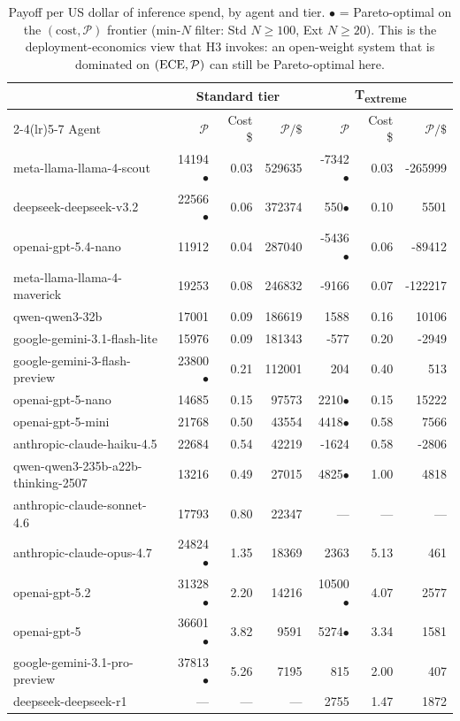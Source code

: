 \begin{table}[t]\centering\small
\caption{Payoff per US dollar of inference spend, by agent and tier. $\bullet$ = Pareto-optimal on the $(\mathrm{cost}, \mathcal{P})$ frontier (min-$N$ filter: Std $N \ge 100$, Ext $N \ge 20$). This is the deployment-economics view that H3 invokes: an open-weight system that is dominated on $(\mathrm{ECE}, \mathcal{P})$ can still be Pareto-optimal here.}
\label{tab:payoff-per-dollar}
\begin{tabular}{lrrr|rrr}
\toprule
 & \multicolumn{3}{c}{Standard tier} & \multicolumn{3}{c}{T\textsubscript{extreme}} \\
\cmidrule(lr){2-4}\cmidrule(lr){5-7}
Agent & $\mathcal{P}$ & Cost \$ & $\mathcal{P}/\$$ & $\mathcal{P}$ & Cost \$ & $\mathcal{P}/\$$ \\
\midrule
meta-llama-llama-4-scout & 14194$\bullet$ & 0.03 & 529635 & -7342$\bullet$ & 0.03 & -265999 \\
deepseek-deepseek-v3.2 & 22566$\bullet$ & 0.06 & 372374 & 550$\bullet$ & 0.10 & 5501 \\
openai-gpt-5.4-nano & 11912 & 0.04 & 287040 & -5436$\bullet$ & 0.06 & -89412 \\
meta-llama-llama-4-maverick & 19253 & 0.08 & 246832 & -9166 & 0.07 & -122217 \\
qwen-qwen3-32b & 17001 & 0.09 & 186619 & 1588 & 0.16 & 10106 \\
google-gemini-3.1-flash-lite & 15976 & 0.09 & 181343 & -577 & 0.20 & -2949 \\
google-gemini-3-flash-preview & 23800$\bullet$ & 0.21 & 112001 & 204 & 0.40 & 513 \\
openai-gpt-5-nano & 14685 & 0.15 & 97573 & 2210$\bullet$ & 0.15 & 15222 \\
openai-gpt-5-mini & 21768 & 0.50 & 43554 & 4418$\bullet$ & 0.58 & 7566 \\
anthropic-claude-haiku-4.5 & 22684 & 0.54 & 42219 & -1624 & 0.58 & -2806 \\
qwen-qwen3-235b-a22b-thinking-2507 & 13216 & 0.49 & 27015 & 4825$\bullet$ & 1.00 & 4818 \\
anthropic-claude-sonnet-4.6 & 17793 & 0.80 & 22347 & --- & --- & --- \\
anthropic-claude-opus-4.7 & 24824$\bullet$ & 1.35 & 18369 & 2363 & 5.13 & 461 \\
openai-gpt-5.2 & 31328$\bullet$ & 2.20 & 14216 & 10500$\bullet$ & 4.07 & 2577 \\
openai-gpt-5 & 36601$\bullet$ & 3.82 & 9591 & 5274$\bullet$ & 3.34 & 1581 \\
google-gemini-3.1-pro-preview & 37813$\bullet$ & 5.26 & 7195 & 815 & 2.00 & 407 \\
deepseek-deepseek-r1 & --- & --- & --- & 2755 & 1.47 & 1872 \\
\bottomrule
\end{tabular}
\end{table}